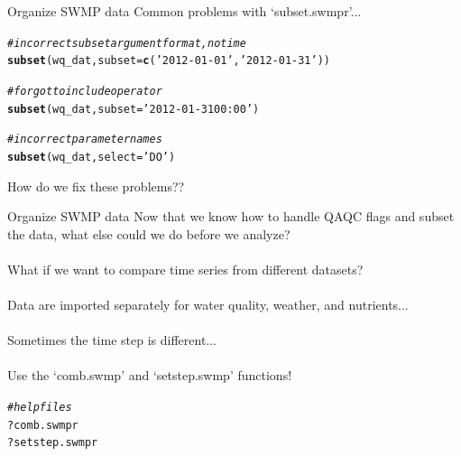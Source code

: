 \documentclass[xcolor=svgnames]{beamer}\usepackage[]{graphicx}\usepackage[]{color}
\makeatletter
\newcommand{\hlstr}[1]{\textcolor[rgb]{0.192,0.494,0.8}{#1}}%
\newcommand{\hlcom}[1]{\textcolor[rgb]{0.678,0.584,0.686}{\textit{#1}}}%
\newcommand{\hlopt}[1]{\textcolor[rgb]{0,0,0}{#1}}%
\newcommand{\hlstd}[1]{\textcolor[rgb]{0.345,0.345,0.345}{#1}}%
\newcommand{\hlkwc}[1]{\textcolor[rgb]{0.333,0.667,0.333}{#1}}%
\newcommand{\hlkwd}[1]{\textcolor[rgb]{0.737,0.353,0.396}{\textbf{#1}}}%
\newenvironment{kframe}{%
 \def\at@end@of@kframe{}%
 \ifinner\ifhmode%
  \def\at@end@of@kframe{\end{minipage}}%
  \begin{minipage}{\columnwidth}%
 \fi\fi%
 \def\FrameCommand##1{\hskip\@totalleftmargin \hskip-\fboxsep
 \colorbox{shadecolor}{##1}\hskip-\fboxsep
     \hskip-\linewidth \hskip-\@totalleftmargin \hskip\columnwidth}%
 \MakeFramed {\advance\hsize-\width
   \@totalleftmargin\z@ \linewidth\hsize
   \@setminipage}}%
 {\par\unskip\endMakeFramed%
 \at@end@of@kframe}
\newenvironment{knitrout}{}{} %
\makeatother
\begin{document}
\begin{frame}[containsverbatim]{Organize SWMP data}
Common problems with `subset.swmpr'...
\begin{knitrout}\scriptsize
{}\color{fgcolor}\begin{kframe}
\begin{alltt}
\hlcom{# incorrect subset argument format, no time}
\hlkwd{subset}\hlstd{(wq_dat,} \hlkwc{subset} \hlstd{=} \hlkwd{c}\hlstd{(}\hlstr{'2012-01-01'}\hlstd{,} \hlstr{'2012-01-31'}\hlstd{))}
\end{alltt}


{\ttfamily\noindent\bfseries\color{errorcolor}{\#\# Error: subset must be of format \%Y-\%m-\%d \%H:\%M}}\begin{alltt}
\hlcom{# forgot to include operator}
\hlkwd{subset}\hlstd{(wq_dat,} \hlkwc{subset} \hlstd{=} \hlstr{'2012-01-31 00:00'}\hlstd{)}
\end{alltt}


{\ttfamily\noindent\bfseries\color{errorcolor}{\#\# Error: Binary operator must be included if only one subset value is provided}}\begin{alltt}
\hlcom{# incorrect parameter names}
\hlkwd{subset}\hlstd{(wq_dat,} \hlkwc{select} \hlstd{=} \hlstr{'DO'}\hlstd{)}
\end{alltt}


{\ttfamily\noindent\bfseries\color{errorcolor}{\#\# Error: select argument is invalid}}\end{kframe}
\end{knitrout}
How do we fix these problems??
\end{frame}

\begin{frame}[containsverbatim]{Organize SWMP data}
Now that we know how to handle QAQC flags and subset the data, what else could we do before we analyze? \\~\\
What if we want to compare time series from different datasets? \\~\\
Data are imported separately for water quality, weather, and nutrients... \\~\\
Sometimes the time step is different...\\~\\
Use the `comb.swmp' and `setstep.swmp' functions!
\begin{knitrout}\scriptsize
{}\color{fgcolor}\begin{kframe}
\begin{alltt}
\hlcom{# help files}
\hlopt{?}\hlstd{comb.swmpr}
\hlopt{?}\hlstd{setstep.swmpr}
\end{alltt}
\end{kframe}
\end{knitrout}
\end{frame}
\end{document}

